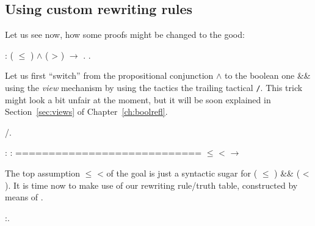 \subsection{Using custom rewriting rules}




Let us see now, how some proofs might be changed to the good:


\begin{coqdoccode}
\coqdocemptyline
\coqdocnoindent
{}   : ( \ensuremath{\le} ) \ensuremath{\land} ( > ) \ensuremath{\rightarrow} .\coqdoceol
\coqdocnoindent
{}.\coqdoceol
\coqdocemptyline
\end{coqdoccode}


Let us first ``switch'' from the propositional conjunction \ensuremath{\land} to the
boolean one \&\& using the \textit{view} mechanism by using the 
tactics the trailing tactical \texttt{/}\ssrtl{/}. This
trick might look a bit unfair at the moment, but it will be soon
explained in Section~\ref{sec:views} of Chapter~\ref{ch:boolrefl}.


\begin{coqdoccode}
\coqdocemptyline
\coqdocnoindent
{}/.\coqdoceol
\coqdocemptyline
\end{coqdoccode}


\coqdoceol
\coqdocemptyline
\coqdocindent{1.00em}
 : \coqdoceol
\coqdocindent{1.00em}
 : \coqdoceol
\coqdocindent{1.00em}
============================\coqdoceol
\coqdocindent{1.50em}
 \ensuremath{\le}  <  \ensuremath{\rightarrow} 

\coqdocemptyline


The top assumption  \ensuremath{\le}  <  of the goal is just a syntactic sugar
for ( \ensuremath{\le} ) \&\& ( < ). 
It is time now to make use of our rewriting rule/truth table,
constructed by means of .


\begin{coqdoccode}
\coqdocemptyline
\coqdocnoindent
{}:.\coqdoceol
\coqdocemptyline
\end{coqdoccode}


